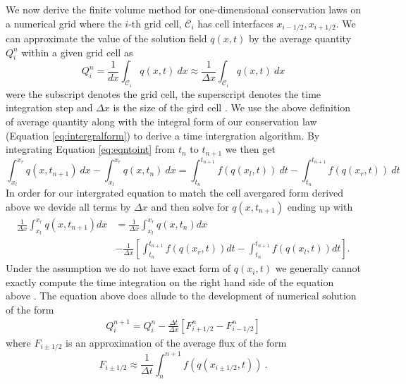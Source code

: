 \documentclass[review,onefignum,onetabnum]{siamart171218}
\begin{document}
We now derive the finite volume method for one-dimensional conservation laws on a numerical grid where the $i$-th grid cell, $\mathcal{C}_i$ has cell interfaces $x_{i-1/2}, x_{i+1/2}$. We can approximate the value of the solution field $q(x,t)$ by the average quantity $Q_i^n$ within a given grid cell as 
\begin{equation}
    Q_i^n  = \frac{1}{dx} \int_{\mathcal{C}_i} q(x,t)\: dx \approx \frac{1}{\Delta x} \int_{\mathcal{C}_i} q(x,t) \: dx
\end{equation}
were the subscript denotes the grid cell, the superscript denotes the time integration step and $\Delta x$ is the size of the gird cell \cite{leveque_2002, comp_seis}. We use the above definition of average quantity along with the integral form of our conservation law (Equation \cref{eq:intergralform}) to derive a time intergration algorithm. By integrating Equation  \cref{eq:eqntoint} from $t_n$ to $t_{n+1}$ we then get 
\begin{equation}
    \int_{x_l}^{x_r} q(x,t_{n+1}) \: dx - \int_{x_l}^{x_r} q(x,t_n) \: dx = \int_{t_n}^{t_{n+1}} f(q(x_l,t)) \: dt  - \int_{t_n}^{t_{n+1}} f(q(x_r ,t)) \: dt
\end{equation}
In order for our intergrated equation to match the cell avergared form derived above we devide all terms by $\Delta x$ and then solve for $q(x,t_{n+1})$ ending up with 
\begin{equation}
\begin{aligned}
    \frac{1}{\Delta x} \int_{x_l}^{x_r} q(x,t_{n+1}) dx  &= \frac{1}{\Delta x} \int_{x_l}^{x_r} q(x,t_n) dx \\
    &- \frac{1}{\Delta x} \left[ \int_{t_n}^{t_{n+1}} f(q(x_r ,t)) dt - \int_{t_n}^{t_{n+1}} f(q(x_l,t)) dt \right].
\end{aligned}
\end{equation}
Under the assumption we do not have exact form of $q(x_i,t)$ we generally cannot exactly compute the time integration on the right hand side of the equation above \cite{leveque_2002}. The equation above does allude to the development of numerical solution of the form 
\begin{align}
    Q_i^{n+1}  = Q_i^{n} - \frac{\Delta t}{\Delta x} \left[ F^n_{i + 1/2} - F^n_{i - 1/2} \right]
\end{align}
where $F_{i\pm 1/2}$ is an approximation of the average flux \cite{leveque_2002} of the form 
\begin{equation}
    F_{i \pm 1/2} \approx \frac{1}{\Delta t} \int_n^{n+1} f(q(x_{i\pm 1/2}, t)) \: .
\end{equation}
\end{document}
